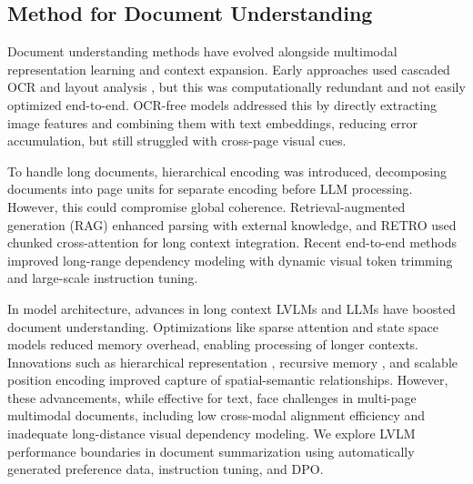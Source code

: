 \subsection{Method for Document Understanding}
Document understanding methods have evolved alongside multimodal representation learning and context expansion. Early approaches used cascaded OCR and layout analysis \cite{xu2020layoutlmv2_ss2, huang2022layoutlmv3_ss3}, but this was computationally redundant and not easily optimized end-to-end. OCR-free models \cite{kim2022ocr_ss4,lee2023pix2struct_ss5} addressed this by directly extracting image features and combining them with text embeddings, reducing error accumulation, but still struggled with cross-page visual cues.

To handle long documents, hierarchical encoding \cite{hierarchical_s35,dong2024multi_ss8} was introduced, decomposing documents into page units for separate encoding before LLM processing. However, this could compromise global coherence. Retrieval-augmented generation (RAG) \cite{yu2024visrag_ss13_ss14,blau2024gram_ss15,mmvqa_s20,shi2023replug_ss19} enhanced parsing with external knowledge, and RETRO \cite{borgeaud2022improving_ss18} used chunked cross-attention for long context integration. Recent end-to-end methods \cite{hu2024mplug_ss12} improved long-range dependency modeling with dynamic visual token trimming and large-scale instruction tuning.

In model architecture, advances in long context LVLMs and LLMs have boosted document understanding. Optimizations like sparse attention \cite{liu2023ring_ss21,jaszczur2021sparse_ss22} and state space models \cite{jaszczur2021sparse_ss22,chen2023longlora_ss23,ding2023longnet_ss24} reduced memory overhead, enabling processing of longer contexts. Innovations such as hierarchical representation \cite{gu2021efficiently_ss25}, recursive memory \cite{fu2022hungry_ss26}, and scalable position encoding \cite{beck2025xlstm_ss27} improved capture of spatial-semantic relationships. However, these advancements, while effective for text, face challenges in multi-page multimodal documents, including low cross-modal alignment efficiency and inadequate long-distance visual dependency modeling. We explore LVLM performance boundaries in document summarization using automatically generated preference data, instruction tuning, and DPO.
